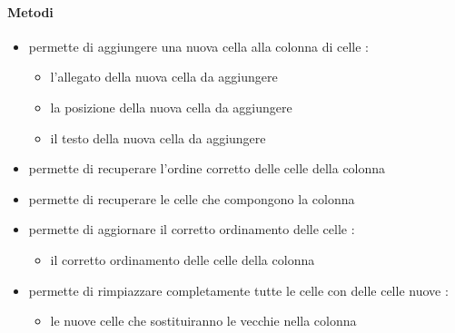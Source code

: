 \paragraph{Metodi}
\begin{itemize}
\item {}
\newline
permette di aggiungere una nuova cella alla colonna di celle
\newline
{} :
\begin{itemize}
\item {}
\newline
l'allegato della nuova cella da aggiungere
\item {}
\newline
la posizione della nuova cella da aggiungere
\item {}
\newline
il testo della nuova cella da aggiungere
\end{itemize}
\item {}
\newline
permette di recuperare l'ordine corretto delle celle della colonna
\newline
\item {}
\newline
permette di recuperare le celle che compongono la colonna
\newline
\item {}
\newline
permette di aggiornare il corretto ordinamento delle celle
\newline
{} :
\begin{itemize}
\item {}
\newline
il corretto ordinamento delle celle della colonna
\end{itemize}
\item {}
\newline
permette di rimpiazzare completamente tutte le celle con delle celle nuove
\newline
{} :
\begin{itemize}
\item {}
\newline
le nuove celle che sostituiranno le vecchie nella colonna
\end{itemize}
\end{itemize}
